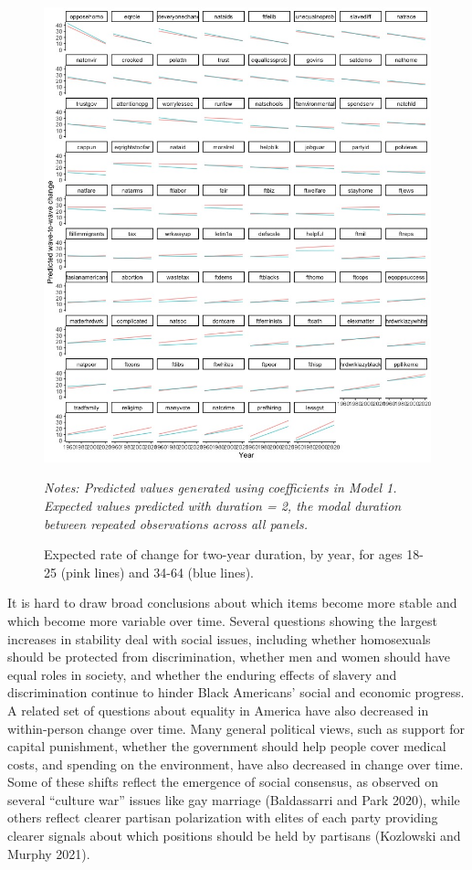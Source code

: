 \documentclass[
  12pt,
]{article}
\begin{document}
\begin{figure}[]
\begin{center}
\caption{Expected rate of change for two-year duration, by year, for ages 18-25 (pink lines) and 34-64 (blue lines).  }

\includegraphics[width=1\linewidth]{../figures/question_plot}

\end{center}
\footnotesize{\textit{Notes: Predicted values generated using coefficients in Model 1. Expected values predicted with duration = 2, the modal duration between repeated observations across all panels.}}
\end{figure}

It is hard to draw broad conclusions about which items become more stable and which become more variable over time. Several questions showing the largest increases in stability deal with social issues, including whether homosexuals should be protected from discrimination, whether men and women should have equal roles in society, and whether the enduring effects of slavery and discrimination continue to hinder Black Americans' social and economic progress. A related set of questions about equality in America have also decreased in within-person change over time. Many general political views, such as support for capital punishment, whether the government should help people cover medical costs, and spending on the environment, have also decreased in change over time. Some of these shifts reflect the emergence of social consensus, as observed on several ``culture war'' issues like gay marriage (Baldassarri and Park 2020), while others reflect clearer partisan polarization with elites of each party providing clearer signals about which positions should be held by partisans (Kozlowski and Murphy 2021).
\end{document}
